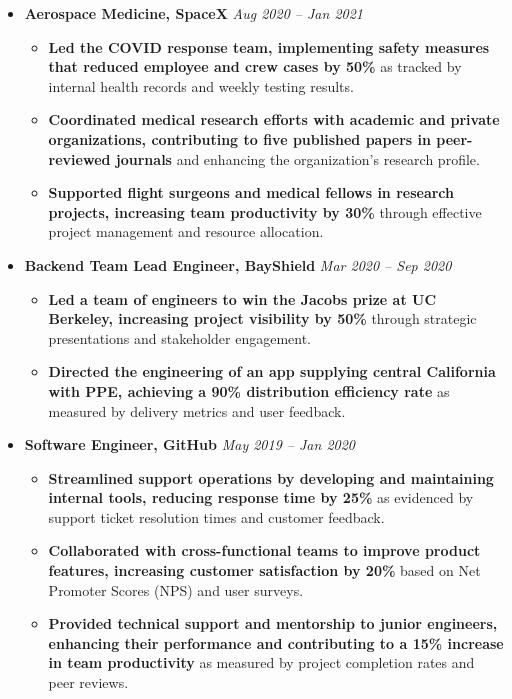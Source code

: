 \documentclass[a4paper,10pt]{article}
\begin{document}
\begin{itemize}[leftmargin=0cm, itemsep=0pt]
    \item \textbf{Aerospace Medicine, SpaceX}
        \hfill \textit{Aug 2020 – Jan 2021}
        \begin{itemize}[leftmargin=0.5cm, itemsep=0pt]
            \item \textbf{Led the COVID response team, implementing safety measures that reduced employee and crew cases by 50\%} as tracked by internal health records and weekly testing results.
            \item \textbf{Coordinated medical research efforts with academic and private organizations, contributing to five published papers in peer-reviewed journals} and enhancing the organization's research profile.
            \item \textbf{Supported flight surgeons and medical fellows in research projects, increasing team productivity by 30\%} through effective project management and resource allocation.
        \end{itemize}

    \item \textbf{Backend Team Lead Engineer, BayShield}
        \hfill \textit{Mar 2020 – Sep 2020}
        \begin{itemize}[leftmargin=0.5cm, itemsep=0pt]
            \item \textbf{Led a team of engineers to win the Jacobs prize at UC Berkeley, increasing project visibility by 50\%} through strategic presentations and stakeholder engagement.
            \item \textbf{Directed the engineering of an app supplying central California with PPE, achieving a 90\% distribution efficiency rate} as measured by delivery metrics and user feedback.
        \end{itemize}

    \item \textbf{Software Engineer, GitHub}
        \hfill \textit{May 2019 – Jan 2020}
        \begin{itemize}[leftmargin=0.5cm, itemsep=0pt]
            \item \textbf{Streamlined support operations by developing and maintaining internal tools, reducing response time by 25\%} as evidenced by support ticket resolution times and customer feedback.
            \item \textbf{Collaborated with cross-functional teams to improve product features, increasing customer satisfaction by 20\%} based on Net Promoter Scores (NPS) and user surveys.
            \item \textbf{Provided technical support and mentorship to junior engineers, enhancing their performance and contributing to a 15\% increase in team productivity} as measured by project completion rates and peer reviews.
        \end{itemize}
\end{itemize}
\end{document}

